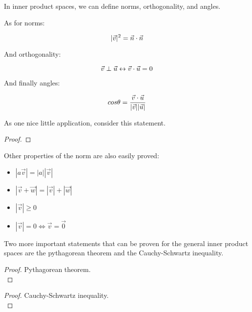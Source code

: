 In inner product spaces, we can define norms, orthogonality, and angles. 

As for norms:

$$ |\vec{v}|^2 = \vec{n} \cdot \vec{n} $$

And orthogonality:

$$ \vec{v} \perp \vec{u} \leftrightarrow \vec{v} \cdot \vec{u} = 0$$

And finally angles: 

$$ cos\theta = \frac{\vec{v} \cdot \vec{u}}{|\vec{v}||\vec{u}|}$$



As one nice little application, consider this statement. 
\begin{proof}
\end{proof}

Other properties of the norm are also easily proved:

\begin{itemize}
    \item $|a\vec{v}| = |a||\vec{v}|$
    \item $|\vec{v} + \vec{w}| = |\vec{v}| + |\vec{w}|$
    \item $|\vec{v}| \geq 0$
    \item $|\vec{v}| = 0 \iff \vec{v} = \vec{0}$
\end{itemize}

Two more important statements that can be proven for the general inner product spaces are the pythagorean theorem and the Cauchy-Schwartz inequality. 

\begin{proof}
    Pythagorean theorem.\\
\end{proof}


\begin{proof}
    Cauchy-Schwartz inequality.\\
\end{proof}


